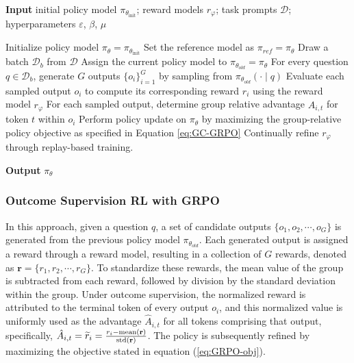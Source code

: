 \begin{itemize}[topsep=0pt]
\begin{itemize}[topsep=0pt]
\begin{algorithm}[t]
  \small
  \caption{Iterative Group Relative Policy Optimization}
  \textbf{Input} initial policy model $\pi_{\theta_{\text{init}}}$; reward models $r_\varphi$; task prompts $\mathcal{D}$; 
  hyperparameters $\varepsilon$, $\beta$, $\mu$
  \begin{algorithmic}[1]
    \State Initialize policy model $\pi_\theta = \pi_{\theta_{\text{init}}}$
       \State Set the reference model as $\pi_{ref} = \pi_{\theta}$
      \State Draw a batch $\mathcal{D}_b$ from $\mathcal{D}$
      \State Assign the current policy model to $\pi_{\theta_{old}} = \pi_{\theta}$
      \State For every question $q \in \mathcal{D}_b$, generate $G$ outputs $\{o_i\}_{i=1}^G$ by sampling from $\pi_{\theta_{old}} (\cdot \mid q) $
      \State Evaluate each sampled output $o_i$ to compute its corresponding reward $r_i$ using the reward model $r_{\varphi}$
      \State For each sampled output, determine group relative advantage $\hat{A}_{i,t}$ for token $t$ within $o_i$
        \State Perform policy update on $\pi_{\theta}$ by maximizing the group-relative policy objective as specified in Equation \ref{eq:GC-GRPO}
      \EndFor
    \EndFor
    \State Continually refine $r_\varphi$ through replay-based training.
    \EndFor 
  \end{algorithmic}
  \textbf{Output} $\pi_\theta$
  \label{alg:iter-grpo}
\end{algorithm}

\subsubsection{Outcome Supervision RL with GRPO} In this approach, given a question $q$, a set of candidate outputs $\{o_1, o_2, \cdots, o_G\}$ is generated from the previous policy model $\pi_{\theta_{old}}$. Each generated output is assigned a reward through a reward model, resulting in a collection of $G$ rewards, denoted as $\mathbf{r}=\{r_1, r_2, \cdots, r_G\}$. To standardize these rewards, the mean value of the group is subtracted from each reward, followed by division by the standard deviation within the group. Under outcome supervision, the normalized reward is attributed to the terminal token of every output $o_i$, and this normalized value is uniformly used as the advantage $\hat{A}_{i, t}$ for all tokens comprising that output, specifically, $\hat{A}_{i, t} = \widetilde{r}_i = \frac{r_i- {\rm mean}(\mathbf{r})}{{\rm std}(\mathbf{r})}$. The policy is subsequently refined by maximizing the objective stated in equation (\ref{eq:GRPO-obj}).


\end{itemize}
\end{itemize}
